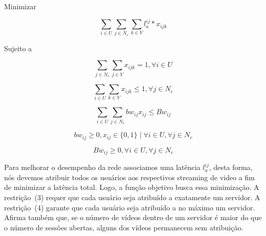
Minimizar

\begin{equation}\label{maximize}
\sum_{i \in U} 
\sum_{j \in N_{c}}
\sum_{k \in V}
l_{a}^{ij} \ast x_{ijk}
\end{equation}

Sujeito a

\begin{equation}\label{bound_1}
\sum_{ j \in N_{c} }
\sum_{ j \in V}
x_{ijk} = 1,  \forall i \in U
\end{equation}

\begin{equation}\label{bound_1}
\sum_{ i \in U}
\sum_{ k \in V }
x_{ijk} \leq 1,  \forall j \in N_{c}
\end{equation}

\begin{equation}\label{minimize}
\sum_{i \in U}
\sum_{j \in N_{c}}
bw_{ij} x_{ij}
\leq Bw_{ij}
\end{equation}

\begin{equation}\label{minimize}
bw_{ij} \geq 0, 
x_{ij}  \in  \{0, 1\} \mid \forall i \in U,\forall j \in N_{c}
\end{equation}

\begin{equation}\label{minimize}
Bw_{ij} \geq  0, \forall i \in U,  \forall j \in N_{c}
\end{equation}
\vspace{1.2cm}

Para melhorar o desempenho da rede associamos uma latência $l_{a}^{ij}$, desta forma, nós devemos atribuir todos os usuários aos respectivos streaming de video a fim de minimizar a latência total.
Logo, a função objetivo busca essa minimização. A restrição~(3) requer que cada usuário seja atribuído a exatamente um servidor. A restrição~(4) garante que cada usuário seja atribuído a no máximo um servidor. Afirma também que, se o número de vídeos dentro de um servidor é maior do que o número de sessões abertas, alguns dos vídeos permanecem sem atribuição.%

